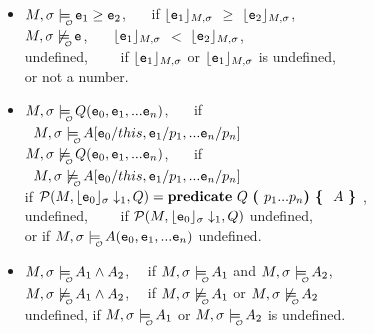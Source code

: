 \begin{definition}
\begin{itemize}
   \item  $\M,\sigma  \modelsWithO \syntax{\sE_1}\geq\syntax{\sE_2}$, \ \ \  if ${\lfloor{ { {{{\ensuremath{\textrm{\ttfamily{e}}}}}_1}}}\rfloor_{M,\sigma}}$
  $\geq$ ${\lfloor{ { {{{\ensuremath{\textrm{\ttfamily{e}}}}}_2}}}\rfloor_{M,\sigma}}$, \\
  {$\M,\sigma  \not\modelsWithO \syntax{\sE}$, \ \ \ ${\lfloor{ { {{{\ensuremath{\textrm{\ttfamily{e}}}}}_1}}}\rfloor_{M,\sigma}}$
  $<$ ${\lfloor{ { {{{\ensuremath{\textrm{\ttfamily{e}}}}}_2}}}\rfloor_{M,\sigma}}$,
  \\
  undefined, \ \ \ \ if ${\lfloor{ { {{{\ensuremath{\textrm{\ttfamily{e}}}}}_1}}}\rfloor_{M,\sigma}}$ or ${\lfloor{ { {{{\ensuremath{\textrm{\ttfamily{e}}}}}_1}}}\rfloor_{M,\sigma}}$ is undefined, \\
  \hspace{1in} or not a number.
}
 \item
 {
 $\M,\sigma   \modelsWithO {\syntax{Q}(\syntax{\sE_0},\syntax{\sE_1},...\syntax{\sE_n})}$, \ \ \ if \\
 $~$  \hspace{.3in} $\M,\sigma  \modelsWithO  \syntax{A}[\syntax{\sE_0}/\syntax{this,\syntax{\sE_1}/\syntax{p_1}, ... \syntax{\sE_n}/\syntax{p_n}]}$
 \\
  $\M,\sigma   \not\modelsWithO {\syntax{Q}(\syntax{\sE_0},\syntax{\sE_1},...\syntax{\sE_n})}$, \ \ \ if \\
 $~$  \hspace{.3in} $\M,\sigma  \not\modelsWithO  \syntax{A}[\syntax{\sE_0}/\syntax{this,\syntax{\sE_1}/\syntax{p_1}, ... \syntax{\sE_n}/\syntax{p_n}]}$
 \\
 if ${\cal P}(M,{\lfloor{ {{{\ensuremath{\textrm{\ttfamily{e}}}}}_0}}\rfloor_{\sigma}}\downarrow_1, {Q})   =  {\bf {predicate}} ~{Q}~{\mbox{\tt{\bf{( }}}} {p_1}...{p_n} \mbox{\tt{\bf{) }}}\mbox{\tt{\bf{\{ }}}~   {A}~ {\mbox{\tt{\bf{\} }}}} $,
 \\
  undefined, \ \ \ \ if ${\cal P}(M,{\lfloor{ {{{\ensuremath{\textrm{\ttfamily{e}}}}}_0}}\rfloor_{\sigma}}\downarrow_1, {Q})$ undefined,\\
   \hspace{1in} or if  $\M,\sigma   \modelsWithO {\syntax{A}(\syntax{\sE_0},\syntax{\sE_1},...\syntax{\sE_n})}$ undefined.
}

    \item
 $\M,\sigma  \modelsWithO \syntax{\A_1}\wedge\syntax{\A_2}$, \ \  if   $\M,\sigma  \modelsWithO \syntax{\A_1}$ and  $\M,\sigma  \modelsWithO \syntax{\A_2}$,
 \\
 {$\M,\sigma \not \modelsWithO \syntax{\A_1}\wedge\syntax{\A_2}$, \ \  if   $\M,\sigma  \not\modelsWithO \syntax{\A_1}$ or  $\M,\sigma  \not\modelsWithO \syntax{\A_2}$}
 \\
 undefined, if  $\M,\sigma  \modelsWithO \syntax{\A_1}$ or  $\M,\sigma  \modelsWithO \syntax{\A_2}$ is undefined.


\end{itemize}
\end{definition}
